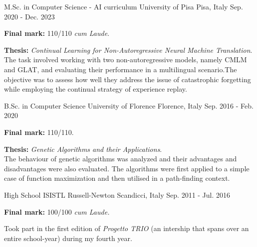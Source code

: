 

\begin{cventries}

\cventry
{M.Sc. in Computer Science - AI curriculum} %
{University of Pisa} %
{Pisa, Italy} %
{Sep. 2020 - Dec. 2023} %
{
    \begin{cvitems} %
        \item{\textbf{Final mark:} 110/110 \textit{cum Laude}.}
        \item{\textbf{Thesis:} \textit{Continual Learning for Non-Autoregressive Neural Machine Translation}.\\
        The task involved working with two non-autoregressive models, namely CMLM and GLAT, and evaluating their performance in a multilingual scenario.The objective was to assess how well they address the issue of catastrophic forgetting while employing the continual strategy of experience replay.}
    \end{cvitems}
}

\cventry
{B.Sc. in Computer Science}
{University of Florence}
{Florence, Italy}
{Sep. 2016 - Feb. 2020}
{
    \begin{cvitems}
        \item{\textbf{Final mark:} 110/110.}
        \item{\textbf{Thesis:} \textit{Genetic Algorithms and their Applications}.\\
        The behaviour of genetic algorithms was analyzed and their advantages and disadvantages were also evaluated. The algorithms were first applied to a simple case of function maximization and then utilised in a path-finding context.}
    \end{cvitems}
}

\cventry
{High School} %
{ISISTL Russell-Newton} %
{Scandicci, Italy} %
{Sep. 2011 - Jul. 2016} %
{
    \begin{cvitems}
        \item{\textbf{Final mark:} 100/100 \textit{cum Laude.}}
        \item{Took part in the first edition of \textit{Progetto TRIO} (an intership that spans over an entire school-year) during my fourth year.}
    \end{cvitems}
}

\end{cventries}
